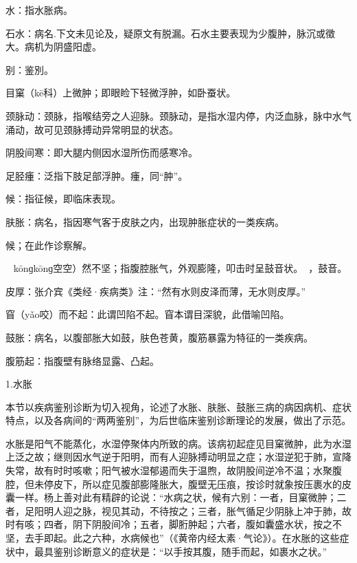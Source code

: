 \documentclass[draft,12pt]{ctexbook}
\begin{document}

\begin{jiaozhu}
	\item 水：指水胀病。
	\item 石水：病名.下文未见论及，疑原文有脱漏。石水主要表现为少腹肿，脉沉或徵大。病机为阴盛阳虚。
	\item 别：鉴別。
	\item 目窠（kē科）上微肿；即眼睑下轻微浮肿，如卧蚕状。
	\item 颈脉动：颈脉，指喉结旁之人迎脉。颈脉动，是指水湿内停，内泛血脉，脉中水气涌动，故可见颈脉搏动异常明显的状态。
	\item 阴股间寒：即大腿内侧因水湿所伤而感寒冷。
	\item 足胫瘇：泛指下肢足部浮肿。瘇，同“肿”。
	\item 候：指征候，即临床表现。
	\item 肤胀：病名，指因寒气客于皮肤之内，出现肿胀症状的一类疾病。
	\item 候；在此作诊察解。
	\item 𪔣𪔣（kōnɡkōnɡ空空）然不坚；指腹腔胀气，外观膨隆，叩击时呈鼓音状。𪔣𪔣，鼓音。
	\item 皮厚：张介宾《类经·疾病类》注：“然有水则皮泽而薄，无水则皮厚。”
	\item 窅（yǎo咬）而不起：此谓凹陷不起。窅本谓目深貌，此借喻凹陷。
	\item 鼓胀：病名，以腹部胀大如鼓，肤色苍黄，腹筋暴露为特征的一类疾病。
	\item 腹筋起：指腹壁有脉络显露、凸起。
\end{jiaozhu}


1.水胀

本节以疾病鉴别诊断为切入视角，论述了水胀、肤胀、鼓胀三病的病因病机、症状特点，以及各病间的“两两鉴别”，为后世临床鉴别诊断理论的发展，做出了示范。

水胀是阳气不能蒸化，水湿停聚体内所致的病。该病初起症见目窠微肿，此为水湿上泛之故；继则因水气逆于阳明，而有人迎脉搏动明显之症；水湿逆犯于肺，宣降失常，故有时时咳嗽；阳气被水湿郁遏而失于温煦，故阴股间逆冷不温；水聚腹腔，但未停皮下，所以症见腹部膨隆胀大，腹壁无压痕，按诊时就象按压裹水的皮囊一样。杨上善对此有精辟的论说：“水病之状，候有六别：一者，目窠微肿；二者，足阳明人迎之脉，视见其动，不待按之；三者，胀气循足少阴脉上冲于肺，故时有咳；四者，阴下阴股间冷；五者，脚胻肿起；六者，腹如囊盛水状，按之不坚，去手即起。此之六种，水病候也”（《黄帝内经太素·气论》）。在水胀的这些症状中，最具鉴别诊断意义的症状是：“以手按其腹，随手而起，如裹水之状。”
\end{document}
